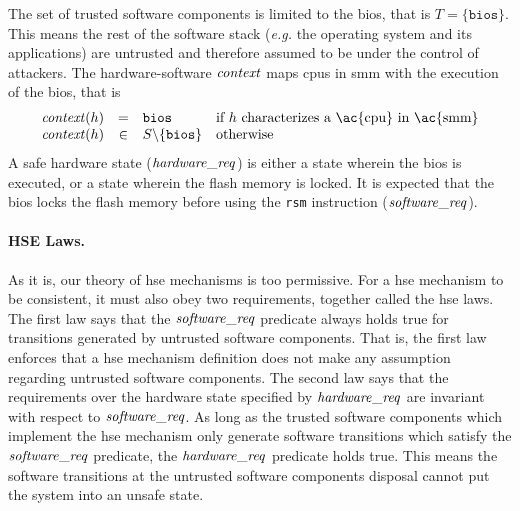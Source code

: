 \begin{example}
  \label{example:speccert:flashdef}
  The set of trusted software components is limited to the \ac{bios}, that is
  \( T = \{ \mathtt{bios} \} \).
  This means the rest of the software stack (\emph{e.g.} the operating system
  and its applications) are untrusted and therefore assumed to be under the
  control of attackers.
  The hardware-software \( \mathit{context} \) maps \acp{cpu} in \ac{smm} with the
  execution of the \ac{bios}, that is
  \[
    \begin{array}{rcll}
      \func{context}(h) & = & \mathtt{bios} & \text{if } h \text{ characterizes
                                              a \ac{cpu} in \ac{smm}} \\
      \func{context}(h) & \in & S \backslash \{ \mathtt{bios} \} & \text{otherwise}
    \end{array}
  \]
  A safe hardware state ($\mathit{hardware\_req}$) is either a state wherein the
  \ac{bios} is executed, or a state wherein the flash memory is locked.
  It is expected that the \ac{bios} locks the flash memory before using the
  \texttt{rsm} instruction ($\mathit{software\_req}$).
\end{example}

\paragraph{HSE Laws.}
%
As it is, our theory of \ac{hse} mechanisms is too permissive.
%
For a \ac{hse} mechanism to be consistent, it must also obey two requirements,
together called the \ac{hse} laws.
%
The first law says that the $\mathit{software\_req}$ predicate always holds true
for transitions generated by untrusted software components.
%
That is, the first law enforces that a \ac{hse} mechanism definition does not
make any assumption regarding untrusted software components.
%
The second law says that the requirements over the hardware state specified by
$\mathit{hardware\_req}$ are invariant with respect to $\mathit{software\_req}$.
%
As long as the trusted software components which implement the \ac{hse}
mechanism only generate software transitions which satisfy the
$\mathit{software\_req}$ predicate, the $\mathit{hardware\_req}$ predicate holds
true.
%
This means the software transitions at the untrusted software components
disposal cannot put the system into an unsafe state.

